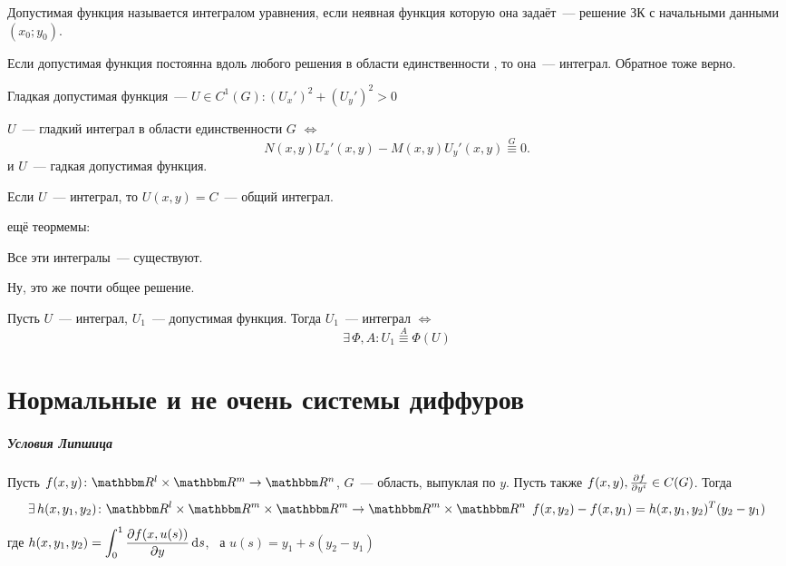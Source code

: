 \documentclass[10pt, timbord]{../notes}
\begin{document}
\begin{defn}\label{defn:simint}
  Допустимая функция называется интегралом уравнения, если неявная функция которую она задаёт~---
  решение ЗК с начальными данными $(x_0; y_0)$.
\end{defn}


\begin{thrm}\label{thrm:constsol}
  Если допустимая функция постоянна вдоль любого решения в области единственности , то она~---
  интеграл. Обратное тоже верно.
\end{thrm}

\begin{defn}\label{defn:smoothacc}
  Гладкая допустимая функция~--- $U\in C^1(G)\colon (U_x')^2 + (U_y')^2 > 0$ 
\end{defn}

\begin{thrm}\label{thrm:smoothint}
  $U$~--- гладкий интеграл в области единственности $G$ $\Leftrightarrow$
  \[
    N(x,y)U_x'(x,y) - M (x, y) U_y' (x, y) \overset{G}{\equiv} 0.
  \]
  и $U$~--- гадкая допустимая функция.
\end{thrm}

\begin{defn}\label{defn:genint}
  Если $U$~--- интеграл, то $U(x,y) = C$~--- общий интеграл.
\end{defn}

ещё теормемы:
\begin{thrm}\label{thrm:simintexist}
  Все эти интегралы~--- существуют.
\end{thrm}
\begin{ittproof}
  Ну, это же почти общее решение.
\end{ittproof}

\begin{thrm}\label{thrm:intconn}
  Пусть $U$~--- интеграл, $U_1$~--- допустимая функция. Тогда $U_1$~--- интеграл $\Leftrightarrow$
  \[
    \exists\, \Phi, A\colon U_1 \overset A \equiv \Phi(U)
  \]
\end{thrm}


\chapter{Нормальные и не очень системы диффуров}
\paragraph{Условия Липшица}


\begin{lem}\label{lem:sys::ad}
  Пусть $f(x,y) \colon \R^l \times \R^m \to \R^n$, $G$~--- область, выпуклая по $y$.
  Пусть также $f(x,y), \frac{\partial f}{\partial y^i} \in C(G)$. Тогда \[
    \exists\, h(x,y_1, y_2) \colon \R^l\times\R^m\times\R^m \to \R^m\times\R^n \;\:
    f(x,y_2) - f(x, y_1) = h(x, y_1, y_2)^T (y_2 - y_1) 
  \]
  где $\displaystyle h(x, y_1, y_2) = \int_0^1 \frac{\partial f(x, u(s))}{\partial y} \, \mathrm{d} s$, \
  а $u(s) = y_1 + s(y_2 - y_1)$
\end{lem}
\end{document}
